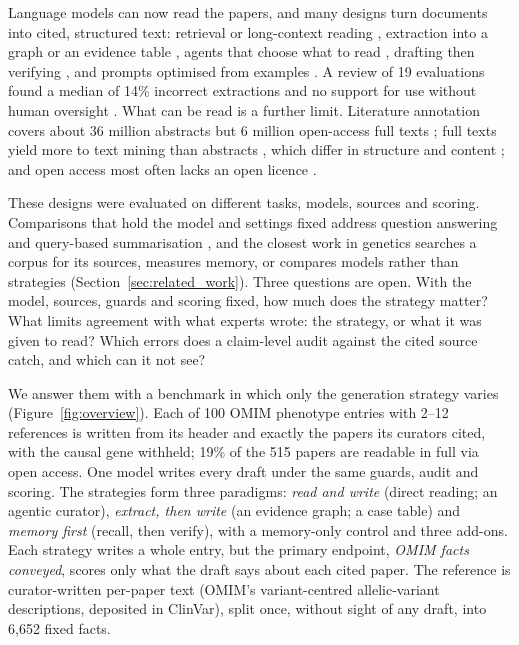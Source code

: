 \documentclass{article} %
\begin{document}
Language models can now read the papers, and many designs turn documents into cited, structured text: retrieval \citep{Lewis2020RetrievalaugmentedGeneration} or long-context reading \citep{li2024retrieval}, extraction into a graph \citep{edge2024local} or an evidence table \citep{joshi2026sliders}, agents that choose what to read \citep{Lla2023PaperqaRetrievalaugmented,skarlinski2024language}, drafting then verifying \citep{dhuliawala2024chainofverification}, and prompts optimised from examples \citep{agrawal2026gepa}. A review of 19 evaluations found a median of 14\% incorrect extractions and no support for use without human oversight \citep{Clark2025GenerativeArtificial}. What can be read is a further limit. Literature annotation covers about 36 million abstracts but 6 million open-access full texts \citep{wei2024pubtator}; full texts yield more to text mining than abstracts \citep{Westergaard2018ComprehensiveQuantitative,Wei2019PubtatorCentral}, which differ in structure and content \citep{Cohen2010StructuralContent}; and open access most often lacks an open licence \citep{Piwowar2018StateOa}.

These designs were evaluated on different tasks, models, sources and scoring. Comparisons that hold the model and settings fixed address question answering and query-based summarisation \citep{li2024retrieval,Li2025LaraBenchmarking,han2025rag}, and the closest work in genetics searches a corpus for its sources, measures memory, or compares models rather than strategies (Section~\ref{sec:related_work}). Three questions are open. With the model, sources, guards and scoring fixed, how much does the strategy matter? What limits agreement with what experts wrote: the strategy, or what it was given to read? Which errors does a claim-level audit against the cited source catch, and which can it not see?

We answer them with a benchmark in which only the generation strategy varies (Figure~\ref{fig:overview}). Each of 100 OMIM phenotype entries with 2--12 references is written from its header and exactly the papers its curators cited, with the causal gene withheld; 19\% of the 515 papers are readable in full via open access. One model writes every draft under the same guards, audit and scoring. The strategies form three paradigms: \emph{read and write} (direct reading; an agentic curator), \emph{extract, then write} (an evidence graph; a case table) and \emph{memory first} (recall, then verify), with a memory-only control and three add-ons. Each strategy writes a whole entry, but the primary endpoint, \emph{OMIM facts conveyed}, scores only what the draft says about each cited paper. The reference is curator-written per-paper text (OMIM's variant-centred allelic-variant descriptions, deposited in ClinVar), split once, without sight of any draft, into 6,652 fixed facts.
\end{document}
